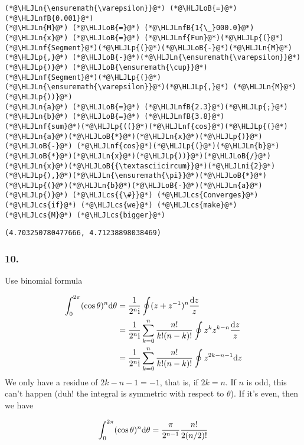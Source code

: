 \documentclass[12pt,landscape]{article}
\newcommand{\HLJLn}[1]{#1}
\newcommand{\HLJLnf}[1]{\textcolor[RGB]{66,102,213}{#1}}
\newcommand{\HLJLnfB}[1]{\textcolor[RGB]{59,151,46}{#1}}
\newcommand{\HLJLni}[1]{\textcolor[RGB]{59,151,46}{#1}}
\newcommand{\HLJLoB}[1]{\textcolor[RGB]{102,102,102}{\textbf{#1}}}
\newcommand{\HLJLp}[1]{#1}
\newcommand{\HLJLcs}[1]{\textcolor[RGB]{153,153,119}{\textit{#1}}}
\def\D{ {\rm d} }
\def\I{ {\rm i} }
\def\dz{\D z}
\begin{document}
{\begin{lstlisting}
(*@\HLJLn{\ensuremath{\varepsilon}}@*) (*@\HLJLoB{=}@*)(*@\HLJLnfB{0.001}@*)
(*@\HLJLn{M}@*) (*@\HLJLoB{=}@*) (*@\HLJLnfB{1{\_}000.0}@*)
(*@\HLJLn{x}@*) (*@\HLJLoB{=}@*) (*@\HLJLnf{Fun}@*)(*@\HLJLp{(}@*)(*@\HLJLnf{Segment}@*)(*@\HLJLp{(}@*)(*@\HLJLoB{-}@*)(*@\HLJLn{M}@*) (*@\HLJLp{,}@*) (*@\HLJLoB{-}@*)(*@\HLJLn{\ensuremath{\varepsilon}}@*)(*@\HLJLp{)}@*) (*@\HLJLoB{\ensuremath{\cup}}@*) (*@\HLJLnf{Segment}@*)(*@\HLJLp{(}@*)(*@\HLJLn{\ensuremath{\varepsilon}}@*)(*@\HLJLp{,}@*) (*@\HLJLn{M}@*)(*@\HLJLp{))}@*)
(*@\HLJLn{a}@*) (*@\HLJLoB{=}@*) (*@\HLJLnfB{2.3}@*)(*@\HLJLp{;}@*) (*@\HLJLn{b}@*) (*@\HLJLoB{=}@*) (*@\HLJLnfB{3.8}@*)
(*@\HLJLnf{sum}@*)(*@\HLJLp{((}@*)(*@\HLJLnf{cos}@*)(*@\HLJLp{(}@*)(*@\HLJLn{a}@*)(*@\HLJLoB{*}@*)(*@\HLJLn{x}@*)(*@\HLJLp{)}@*) (*@\HLJLoB{-}@*) (*@\HLJLnf{cos}@*)(*@\HLJLp{(}@*)(*@\HLJLn{b}@*)(*@\HLJLoB{*}@*)(*@\HLJLn{x}@*)(*@\HLJLp{))}@*)(*@\HLJLoB{/}@*)(*@\HLJLn{x}@*)(*@\HLJLoB{{\textasciicircum}}@*)(*@\HLJLni{2}@*)(*@\HLJLp{),}@*)(*@\HLJLn{\ensuremath{\pi}}@*)(*@\HLJLoB{*}@*)(*@\HLJLp{(}@*)(*@\HLJLn{b}@*)(*@\HLJLoB{-}@*)(*@\HLJLn{a}@*)(*@\HLJLp{)}@*) (*@\HLJLcs{{\#}}@*) (*@\HLJLcs{Converges}@*) (*@\HLJLcs{if}@*) (*@\HLJLcs{we}@*) (*@\HLJLcs{make}@*) (*@\HLJLcs{M}@*) (*@\HLJLcs{bigger}@*)
\end{lstlisting}

\begin{lstlisting}
(4.703250780477666, 4.71238898038469)
\end{lstlisting}
\newpage

\subsubsection{10.}
Use binomial formula


\begin{align*}
\int_0^{2 \pi} (\cos \theta)^n \D \theta &= {1 \over 2^n \I} \oint (z+z^{-1})^n {\dz \over z} \\
 &=  {1 \over 2^n \I} \sum_{k=0}^n {n! \over k! (n-k)!} \oint z^k z^{k-n} {\dz \over z} \\
 &=  {1 \over 2^n \I} \sum_{k=0}^n {n! \over k! (n-k)!} \oint z^{2k-n-1}\dz
\end{align*}
We only have a residue of $2k-n-1 = -1$, that is, if $2k = n$. If $n$ is odd, this can't happen (duh! the integral is symmetric with respect to $\theta$). If it's even, then we have

\[
\int_0^{2 \pi} (\cos \theta)^n \D \theta =  {\pi \over 2^{n-1} }  {n! \over 2 (n/2)!}
\]

}
\end{document}
